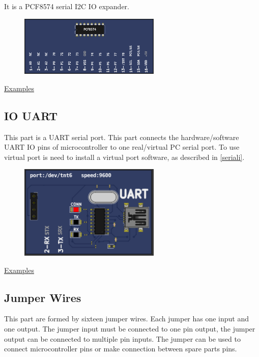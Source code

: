 It is a PCF8574 serial I2C IO expander.

\begin{figure}[H]
\center
\includegraphics[width=0.6\textwidth]{img/part_pcf8574.png} 
\end{figure} 

\href{https://lcgamboa.github.io/picsimlab_examples/Parts.html\#IO_PCF8574}{Examples}


\subsection{IO UART}

This part is a UART serial port. This part connects the hardware/software UART IO pins of microcontroller to
one real/virtual PC serial port. To use virtual port is need to install a virtual port software, as described in \ref{seriali}. 

\begin{figure}[H]
\center
\includegraphics[width=0.6\textwidth]{img/part_uart.png} 
\end{figure} 

\href{https://lcgamboa.github.io/picsimlab_examples/Parts.html\#IO_UART}{Examples}


\subsection{Jumper Wires}

This part are formed by sixteen jumper wires. Each jumper has one input and one output.  The jumper input must be connected to one pin output, 
the jumper output can be connected to multiple pin inputs. The jumper can be used to connect microcontroller pins or make connection between 
spare parts pins.   


